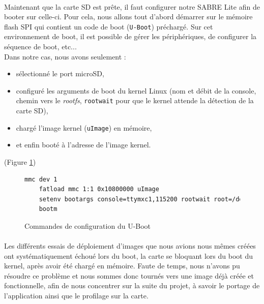 \paragraph{} Maintenant que la carte SD est prête, il faut configurer notre
SABRE Lite afin de booter sur celle-ci. Pour cela, nous allons tout d'abord
démarrer sur le mémoire flash SPI qui contient un code de boot
(\texttt{U-Boot}\cite{denk_denx_2015}) préchargé. Sur cet environnement de
boot, il est possible de gérer les périphériques, de configurer la séquence de
boot, etc... \\
Dans notre cas, nous avons seulement :
\begin{itemize}
\renewcommand{\labelitemi}{$\bullet$}
\item sélectionné le port microSD, 
\item configuré les arguments de boot du kernel Linux (nom et débit de la
  console, chemin vers le \textit{rootfs}, \texttt{rootwait} pour que le kernel
  attende la détection de la carte SD),
\item chargé l'image kernel (\texttt{uImage}) en mémoire,
\item et enfin booté à l'adresse de l'image kernel.
\end{itemize}
(Figure \ref{ubootcmds})

\begin{figure}[H]
  \centering
  \begin{lstlisting}[language=bash, frame=single, basicstyle=\scriptsize]
    mmc dev 1
    fatload mmc 1:1 0x10800000 uImage
    setenv bootargs console=ttymxc1,115200 rootwait root=/dev/mmcblk0p2
    bootm
  \end{lstlisting}
  \caption{Commandes de configuration du U-Boot}
  \label{ubootcmds}
\end{figure}

\paragraph{}
Les différents essais de déploiement d'images que nous avions nous mêmes créées
ont systématiquement échoué lors du boot, la carte se bloquant lors du boot
du kernel, après avoir été chargé en mémoire. Faute de temps, nous n'avons pu
résoudre ce problème et nous sommes donc tournés vers une image déjà créée et
fonctionnelle, afin de nous concentrer sur la suite du projet, à savoir le
portage de l'application ainsi que le profilage sur la carte.
